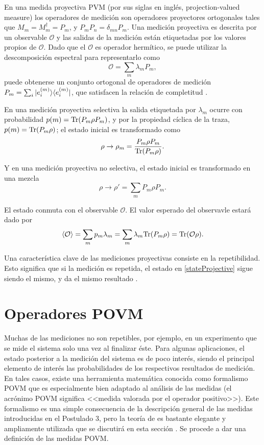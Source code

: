 En una medida proyectiva PVM (por sus siglas en inglés, projection-valued measure) los operadores de medición son operadores proyectores ortogonales  tales que $M_{m}=M_{m}^{\dagger}=P_{m}$, y $P_{m}P_{n}=\delta_{mn}P_{m}$. Una medición proyectiva es descrita por un observable $\mathcal{O}$ y las salidas de la medición están etiquetadas por los valores propios de $\mathcal{O}$. Dado que el $\mathcal{O}$ es operador hermítico, se puede utilizar la descomposición espectral para representarlo como 
\begin{equation}
	\mathcal{O}=\sum_m \lambda_m P_m ,
\end{equation}  puede obtenerse un conjunto ortogonal de operadores de medición $P_m=\sum_i |e_i^{(m)}\rangle \langle e_i^{(m)}|$, que satisfacen la relación de completitud {\cite{2007geometry}}. 



En una medición proyectiva selectiva la salida etiquetada por $\lambda_m$ ocurre con probabilidad $p(m)={\rm Tr}(P_m\rho P_m)$, y por la propiedad cíclica de la traza,  $p(m)={\rm Tr}(P_m\rho)$; el estado inicial es transformado como 
\begin{equation}\label{stateProjective}
	\rho\to	\rho_m=\dfrac{P_m\rho P_m}{{\rm Tr}(P_m \rho)}.
\end{equation}

 Y en una medición proyectiva no selectiva, el estado inicial es transformado en una mezcla  \begin{equation}
	\rho \to \rho'=\sum_m P_m \rho P_m.
\end{equation} 


El estado conmuta con el observable $\mathcal{O}$. El valor esperado del observavle estará dado por 
\begin{equation}
	\langle \mathcal{O} \rangle=\sum_m p_m\lambda_m=\sum_m \lambda_m {\rm Tr}(P_m\rho)={\rm Tr}(\mathcal{O}\rho).
\end{equation}

Una característica clave de las mediciones proyectivas consiste en la repetibilidad. Esto significa que si la medición es repetida, el estado en {\ref{stateProjective}} sigue siendo el mismo, y da el mismo resultado {\cite{2007geometry}}.

\section{Operadores POVM}\label{operadoresPOVM}

Muchas de las mediciones no son repetibles, por ejemplo, en un experimento que se mide el sistema solo una vez al finalizar éste. Para algunas aplicaciones, el estado posterior a la medición del sistema es de poco interés, siendo el principal elemento de interés las probabilidades de los respectivos resultados de medición. En tales casos, existe una herramienta matemática conocida como formalismo POVM que es especialmente bien adaptado al análisis de las medidas (el acrónimo POVM significa <<medida valorada por el operador positivo>>). Este formalismo es una simple consecuencia de la descripción general de las medidas introducidas en el Postulado 3, pero la teoría de es bastante elegante y ampliamente utilizada que se discutirá en esta sección {\cite{nielsen_chuang_2010}}. Se procede a dar una definición de las medidas POVM\@.

